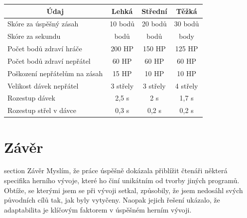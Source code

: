 \documentclass[12pt,a4paper,hidelinks]{article}
\begin{document}
\begin{table}[h!]
\centering
\begin{tabular}{@{}l|ccc@{}}
\toprule
\multicolumn{1}{c|}{\textbf{Údaj}} & \textbf{Lehká} & \textbf{Střední} & \textbf{Těžká} \\ \midrule
Skóre za úspěšný zásah             & 10 bodů        & 20 bodů          & 30 bodů        \\
Skóre za sekundu                   & \textminus5 bodů        & \textminus3 bodů          & \textminus2 body        \\
Počet bodů zdraví hráče            & 200 HP         & 150 HP           & 125 HP         \\
Počet bodů zdraví nepřátel         & 60 HP          & 60 HP            & 60 HP          \\
Poškození nepřátelům na zásah      & 15 HP          & 10 HP            & 10 HP          \\
Velikost dávek nepřátel            & 3 střely       & 3 střely         & 4 střely       \\
Rozestup dávek                     & 2,5 s          & 2 s              & 1,7 s          \\
Rozestup střel v dávce             & 0,3 s          & 0,2 s            & 0,2 s          \\ \bottomrule
\end{tabular}
\end{table}


\clearpage
\section*{Závěr}
 {section} {Závěr}
Myslím, že práce úspěšně dokázala přiblížit čtenáři některá specifika herního vývoje, které ho činí unikátním od tvorby jiných programů. Obtíže, se kterými jsem se při vývoji setkal, způsobily, že jsem nedosáhl svých původních cílů tak, jak byly vytyčeny. Naopak jejich řešení ukázalo, že adaptabilita je klíčovým faktorem v úspěšném herním vývoji.
\end{document}
